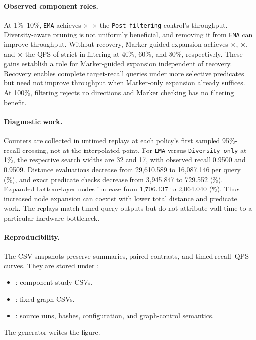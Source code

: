 \paragraph{Observed component roles.}
At 1\%--10\%, \texttt{EMA} achieves \EMAAblationFullLowMin$\times$--\EMAAblationFullLowMax$\times$ the \texttt{Post-filtering} control's throughput.
Diversity-aware pruning is not uniformly beneficial, and removing it from \texttt{EMA} can improve throughput.
Without recovery, Marker-guided expansion achieves \EMAAblationMarkerForty$\times$, \EMAAblationMarkerSixty$\times$, and \EMAAblationMarkerEighty$\times$ the QPS of strict in-filtering at 40\%, 60\%, and 80\%, respectively.
These gains establish a role for Marker-guided expansion independent of recovery.
Recovery enables complete target-recall queries under more selective predicates but need not improve throughput when Marker-only expansion already suffices.
At 100\%, filtering rejects no directions and Marker checking has no filtering benefit.

\paragraph{Diagnostic work.}
Counters are collected in untimed replays at each policy's first sampled 95\%-recall crossing, not at the interpolated point.
For \texttt{EMA} versus \texttt{Diversity only} at 1\%, the respective search widths are 32 and 17, with observed recall 0.9500 and 0.9509.
Distance evaluations decrease from 29,610.589 to 16,087.146 per query (\EMAAblationDistanceReduction\%), and exact predicate checks decrease from 3,945.847 to 729.552 (\EMAAblationPredicateReduction\%).
Expanded bottom-layer nodes increase from 1,706.437 to 2,064.040 (\EMAAblationExpansionIncrease\%).
Thus increased node expansion can coexist with lower total distance and predicate work.
The replays match timed query outputs but do not attribute wall time to a particular hardware bottleneck.

\paragraph{Reproducibility.}
The CSV snapshots preserve summaries, paired contrasts, and timed recall--QPS curves.
They are stored under :
\begin{itemize}
    \item {}: component-study CSVs.
    \item {}: fixed-graph CSVs.
    \item {}: source runs, hashes, configuration, and graph-control semantics.
\end{itemize}
The generator  writes the figure.


